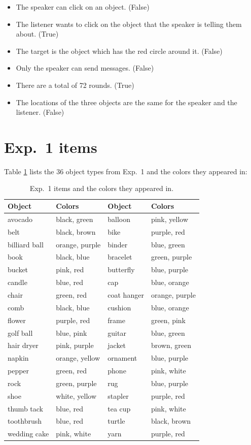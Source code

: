 \documentclass[11pt]{article}
\newcommand{\tableref}[1]{Table \ref{#1}}
\begin{document}
\begin{itemize}
	\item The speaker can click on an object. (False)
	\item The listener wants to click on the object that the speaker is
  telling them about. (True)
  \item  The target is the object which has the red circle around it. (False)
  \item Only the speaker can send messages. (False)
  \item There are a total of 72 rounds. (True)
  \item The locations of the three objects are the same for the speaker and the listener. (False)
\end{itemize}


\section{Exp.~1 items}
\label{app:itemtypes}

\tableref{tab:exp1items} lists the 36 object types from Exp.~1 and the colors they appeared in:

\begin{table}[h]
\caption{Exp.~1 items and the colors they appeared in.}
\centering
\begin{tabular}{l l l l}
\toprule
Object & Colors & Object & Colors \\
\midrule
avocado & black, green & balloon & pink, yellow \\
belt & black, brown & bike & purple, red\\
billiard ball & orange, purple & binder & blue, green \\
book & black, blue & bracelet & green, purple \\
bucket & pink, red & butterfly & blue, purple\\
candle & blue, red & cap & blue, orange \\
chair & green, red & coat hanger & orange, purple \\
comb & black, blue & cushion & blue, orange\\
flower & purple, red & frame & green, pink \\
golf ball & blue, pink & guitar & blue, green\\
hair dryer & pink, purple & jacket & brown, green\\
napkin & orange, yellow & ornament & blue, purple\\
pepper & green, red & phone & pink, white\\
rock & green, purple & rug & blue, purple \\
shoe & white, yellow & stapler & purple, red\\
thumb tack & blue, red & tea cup & pink, white \\
toothbrush & blue, red & turtle & black, brown \\
wedding cake & pink, white & yarn & purple, red\\
\bottomrule
\end{tabular}
\label{tab:exp1items}
\end{table}
\end{document}
